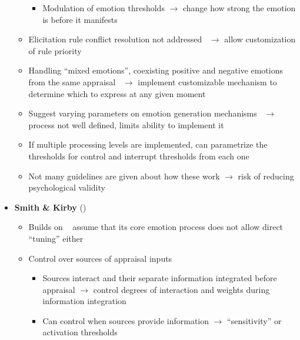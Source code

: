 \begin{itemize}
\begin{itemize}
\begin{itemize}
            \item Modulation of emotion thresholds $\rightarrow$ change how
            strong the emotion is before it manifests
        \end{itemize}

        \item Elicitation rule conflict resolution not
        addressed~\citep[p.~190]{occ} $\rightarrow$ allow customization of rule
        priority

        \item Handling ``mixed emotions'', coexisting positive and negative
        emotions from the same appraisal~\citep[p.~51--52]{occ} $\rightarrow$
        implement customizable mechanism to determine which to express at any
        given moment

        \item Suggest varying parameters on emotion generation
        mechanisms~\citep[p.~203]{ortony2002making} $\rightarrow$ process not
        well defined, limits ability to implement it

        \item If multiple processing levels are implemented, can parametrize
        the thresholds for control and interrupt thresholds from each
        one~\citep[p.~185]{ortony2005affect}

        \item Not many guidelines are given about how these work $\rightarrow$
        risk of reducing psychological validity
    \end{itemize}

    \item \textbf{Smith \& Kirby} (\good)
    \begin{itemize}
        \item Builds on \cite{smith1990emotion}~\citep[p.~122]{smith2001toward}
        \wasytherefore{} assume that its core emotion process does not allow
        direct ``tuning'' either

        \item Control over sources of appraisal
        inputs~\citep[p.~93--94, 100]{smith2000consequences}
        \begin{itemize}
            \item Sources interact and their separate information integrated
            before appraisal $\rightarrow$ control degrees of interaction and
            weights during information integration

            \item Can control when sources provide information $\rightarrow$
            ``sensitivity'' or activation thresholds


\end{itemize}
\end{itemize}
\end{itemize}
